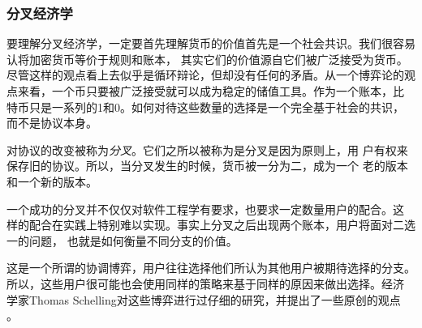 \documentclass[letterpaper]{article}
\begin{document}
\subsubsection{分叉经济学}

要理解分叉经济学，一定要首先理解货币的价值首先是一个社会共识。我们很容易认将加密货币等价于规则和账本，
其实它们的价值源自它们被广泛接受为货币。尽管这样的观点看上去似乎是循环辩论，但却没有任何的矛盾。从一个博弈论的观
点来看，一个币只要被广泛接受就可以成为稳定的储值工具。作为一个账本，比
特币只是一系列的1和0。如何对待这些数量的选择是一个完全基于社会的共识，
而不是协议本身。

对协议的改变被称为\emph{分叉}。它们之所以被称为是分叉是因为原则上，用
户有权来保存旧的协议。所以，当分叉发生的时候，货币被一分为二，成为一个
老的版本和一个新的版本。

一个成功的分叉并不仅仅对软件工程学有要求，也要求一定数量用户的配合。这
样的配合在实践上特别难以实现。事实上分叉之后出现两个账本，用户将面对二选一的问题，
也就是如何衡量不同分支的价值。

这是一个所谓的协调博弈，用户往往选择他们所认为其他用户被期待选择的分支。
所以，这些用户很可能也会使用同样的策略来基于同样的原因来做出选择。经济
学家Thomas Schelling对这些博弈进行过仔细的研究，并提出了一些原创的观点
\cite{schelling}。
\end{document}
